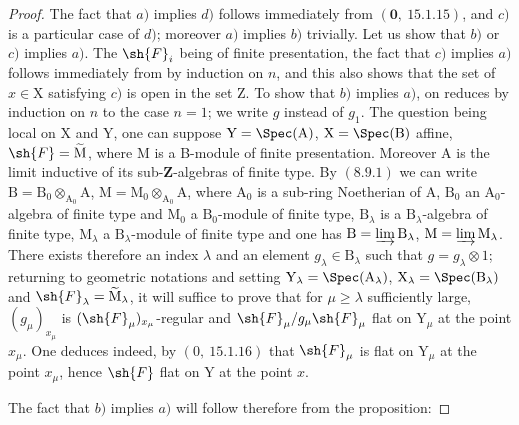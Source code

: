 \begin{proof}
The fact that $a)$ implies $d)$ follows immediately from $(\mathbf{0},~15.1.15)$, and $c)$ is a particular case of $d)$; moreover $a)$ implies $b)$ trivially. Let us show that $b)$ or $c)$ implies $a)$. The $\sh{F}_i$ being of finite presentation, the fact that $c)$ implies $a)$ follows immediately from  by induction on $n$, and this also shows that the set of $x\in\mathrm{X}$ satisfying $c)$ is open in the set $\mathrm{Z}$. To show that $b)$ implies $a)$, on reduces by induction on $n$ to the case $n=1$; we write $g$ instead of $g_1$. The question being local on $\mathrm{X}$ and $\mathrm{Y}$, one can suppose $\mathrm{Y}=\Spec(\mathrm{A})$, $\mathrm{X}=\Spec(\mathrm{B})$ affine, $\sh{F}=\widetilde{\mathrm{M}}$, where $\mathrm{M}$ is a B-module of finite presentation. Moreover $\mathrm{A}$ is the limit inductive of its sub-$\mathbf{Z}$-algebras of finite type. By $(8.9.1)$ we can write $\mathrm{B}=\mathrm{B}_0\otimes_{\mathrm{A}_0}\mathrm{A}$, $\mathrm{M}=\mathrm{M}_0\otimes_{\mathrm{A}_0}\mathrm{A}$, where $\mathrm{A}_0$ is a sub-ring Noetherian of $\mathrm{A}$, $\mathrm{B}_0$ an $\mathrm{A}_0$-algebra of finite type and $\mathrm{M}_0$ a $\mathrm{B}_0$-module of finite type, $\mathrm{B}_\lambda$ is a $\mathrm{B}_\lambda$-algebra of finite type, $\mathrm{M}_\lambda$ a $\mathrm{B}_\lambda$-module of finite type and one has $\mathrm{B}=\varinjlim\mathrm{B}_\lambda$, $\mathrm{M}=\varinjlim\mathrm{M}_\lambda$. There exists therefore an index $\lambda$ and an element $g_\lambda\in\mathrm{B}_\lambda$ such that $g=g_\lambda\otimes 1$; returning to geometric notations and setting $\mathrm{Y}_\lambda=\Spec(\mathrm{A}_\lambda)$, $\mathrm{X}_\lambda=\Spec(\mathrm{B}_\lambda)$ and $\sh{F}_\lambda=\widetilde{\mathrm{M}}_\lambda$, it will suffice to prove that for $\mu\geqslant\lambda$ sufficiently large, $(g_\mu)_{x_\mu}$ is $(\sh{F}_\mu)_{x_\mu}$-regular and $\sh{F}_\mu/g_\mu\sh{F}_\mu$ flat on $\mathrm{Y}_\mu$ at the point $x_\mu$. One deduces indeed, by $(0,~15.1.16)$ that $\sh{F}_\mu$ is flat on $\mathrm{Y}_\mu$ at the point $x_\mu$, hence $\sh{F}$ flat on $\mathrm{Y}$ at the point $x$.

The fact that $b)$ implies $a)$ will follow therefore from the proposition:


\end{proof}
